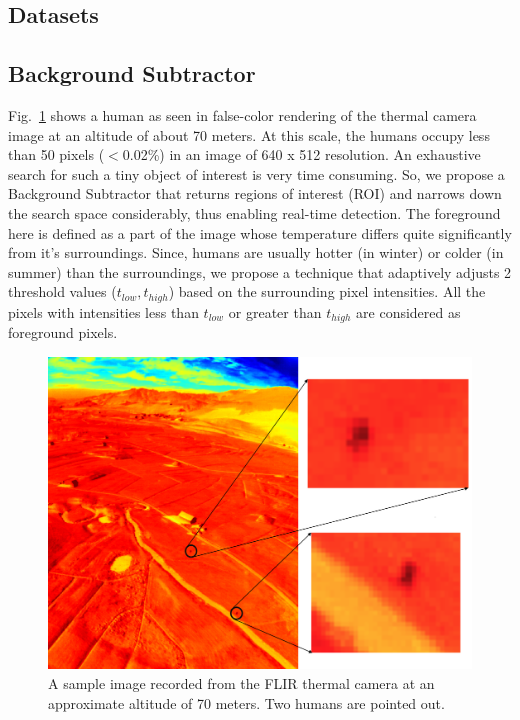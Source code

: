 \documentclass[runningheads]{llncs}
\begin{document}
\subsection{Datasets}

\subsection{Background Subtractor}
Fig.~\ref{fig:thermal_sample} shows a human as seen in false-color rendering of the thermal camera image at an altitude of about 70 meters. At this scale, the humans occupy less than 50 pixels ($<$0.02\%) in an image of 640 x 512 resolution. An exhaustive search for such a tiny object of interest is very time consuming. So, we propose a Background Subtractor that returns regions of interest (ROI) and narrows down the search space considerably, thus enabling real-time detection. The foreground here is defined as a part of the image whose temperature differs quite significantly from it's surroundings. Since, humans are usually hotter (in winter) or colder (in summer) than the surroundings, we propose a technique that adaptively adjusts 2 threshold values ($t_{low}, t_{high}$) based on the surrounding pixel intensities. All the pixels with intensities less than $t_{low}$ or greater than $t_{high}$ are considered as foreground pixels.

\begin{figure}
\centerline{\includegraphics[scale=0.3]{img/sample_thermal.png}}
\caption{A sample image recorded from the FLIR thermal camera at an approximate altitude of 70 meters. Two humans are pointed out.}
\label{fig:thermal_sample}
\end{figure}
\end{document}

